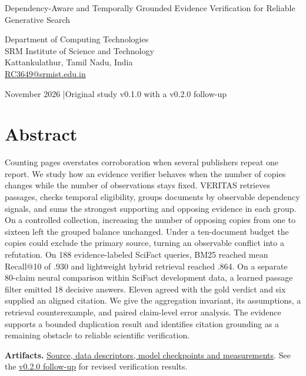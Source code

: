 \documentclass[12pt,letterpaper]{article}
\begin{document}
\thispagestyle{empty}
\par
\vspace{1.4em}
\vspace{0.35em}
{\raggedright\noindent\Large Dependency-Aware and Temporally Grounded Evidence Verification for Reliable Generative Search\par}
\vspace{1em}
\par\noindent
Department of Computing Technologies\\
SRM Institute of Science and Technology\\
Kattankulathur, Tamil Nadu, India\\
\href{mailto:RC3649@srmist.edu.in}{RC3649@srmist.edu.in}\par
\medskip{} November 2026 \quad|\quad Original study v0.1.0 with a v0.2.0 follow-up
\section*{Abstract}
Counting pages overstates corroboration when several publishers repeat one report. We study how an evidence verifier behaves when the number of copies changes while the number of observations stays fixed. VERITAS retrieves passages, checks temporal eligibility, groups documents by observable dependency signals, and sums the strongest supporting and opposing evidence in each group. On a controlled collection, increasing the number of opposing copies from one to sixteen left the grouped balance unchanged. Under a ten-document budget the copies could exclude the primary source, turning an observable conflict into a refutation. On 188 evidence-labeled SciFact queries, BM25 reached mean Recall@10 of .930 and lightweight hybrid retrieval reached .864. On a separate 80-claim neural comparison within SciFact development data, a learned passage filter emitted 18 decisive answers. Eleven agreed with the gold verdict and six supplied an aligned citation. We give the aggregation invariant, its assumptions, a retrieval counterexample, and paired claim-level error analysis. The evidence supports a bounded duplication result and identifies citation grounding as a remaining obstacle to reliable scientific verification.

\smallskip\noindent\textbf{Artifacts.} \href{https://github.com/Rahulchaube1/veritas}{Source, data descriptors, model checkpoints and measurements}. See the \hyperref[sec:followup]{v0.2.0 follow-up} for revised verification results.\par
\clearpage
\tableofcontents
\clearpage







\end{document}
